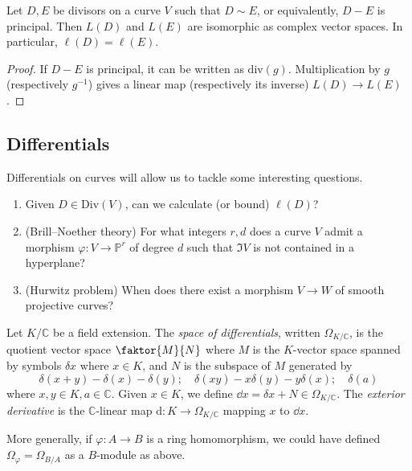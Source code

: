 \begin{proposition}
    Let \( D, E \) be divisors on a curve \( V \) such that \( D \sim E \), or equivalently, \( D - E \) is principal.
    Then \( L(D) \) and \( L(E) \) are isomorphic as complex vector spaces.
    In particular, \( \ell(D) = \ell(E) \).
\end{proposition}
\begin{proof}
    If \( D - E \) is principal, it can be written as \( \mathrm{div}(g) \).
    Multiplication by \( g \) (respectively \( g^{-1} \)) gives a linear map (respectively its inverse) \( L(D) \to L(E) \).
\end{proof}

\subsection{Differentials}
Differentials on curves will allow us to tackle some interesting questions.
\begin{enumerate}
    \item Given \( D \in \mathrm{Div}(V) \), can we calculate (or bound) \( \ell(D) \)?
    \item (Brill--Noether theory) For what integers \( r, d \) does a curve \( V \) admit a morphism \( \varphi \colon V \to \mathbb P^r \) of degree \( d \) such that \( \Im V \) is not contained in a hyperplane?
    \item (Hurwitz problem) When does there exist a morphism \( V \to W \) of smooth projective curves?
\end{enumerate}
\begin{definition}
    Let \( K / \mathbb C \) be a field extension.
    The \emph{space of differentials}, written \( \Omega_{K/\mathbb C} \), is the quotient vector space \( \faktor{M}{N} \) where \( M \) is the \( K \)-vector space spanned by symbols \( \delta x \) where \( x \in K \), and \( N \) is the subspace of \( M \) generated by
    \[ \delta(x + y) - \delta(x) - \delta(y);\quad \delta(xy) - x\delta(y) - y\delta(x);\quad \delta(a) \]
    where \( x, y \in K, a \in \mathbb C \).
    Given \( x \in K \), we define \( \dd{x} = \delta x + N \in \Omega_{K/\mathbb C} \).
    The \emph{exterior derivative} is the \( \mathbb C \)-linear map \( \mathrm{d} \colon K \to \Omega_{K/\mathbb C} \) mapping \( x \) to \( \dd{x} \).
\end{definition}
\begin{remark}
    More generally, if \( \varphi \colon A \to B \) is a ring homomorphism, we could have defined \( \Omega_\varphi = \Omega_{B/A} \) as a \( B \)-module as above.
\end{remark}
